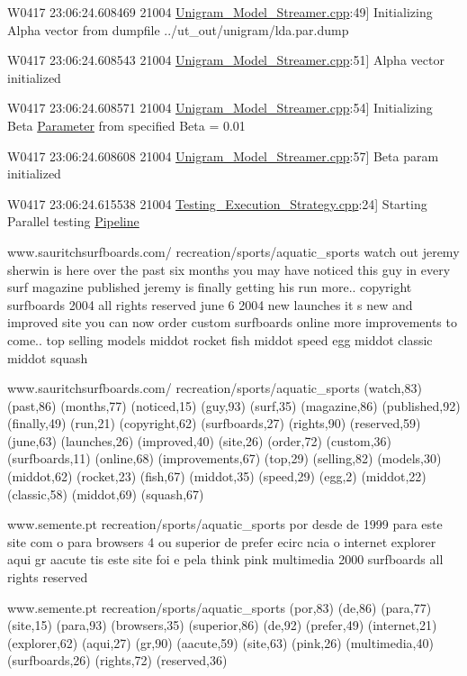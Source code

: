{\ttfamily W0417 23:06:24.608469 21004 \hyperlink{_unigram___model___streamer_8cpp}{Unigram\_\-Model\_\-Streamer.cpp}:49\mbox{]} Initializing Alpha vector from dumpfile ../ut\_\-out/unigram/lda.par.dump  }

{\ttfamily W0417 23:06:24.608543 21004 \hyperlink{_unigram___model___streamer_8cpp}{Unigram\_\-Model\_\-Streamer.cpp}:51\mbox{]} Alpha vector initialized  }

{\ttfamily W0417 23:06:24.608571 21004 \hyperlink{_unigram___model___streamer_8cpp}{Unigram\_\-Model\_\-Streamer.cpp}:54\mbox{]} Initializing Beta \hyperlink{struct_parameter}{Parameter} from specified Beta = 0.01  }

{\ttfamily W0417 23:06:24.608608 21004 \hyperlink{_unigram___model___streamer_8cpp}{Unigram\_\-Model\_\-Streamer.cpp}:57\mbox{]} Beta param initialized  }

{\ttfamily W0417 23:06:24.615538 21004 \hyperlink{_testing___execution___strategy_8cpp}{Testing\_\-Execution\_\-Strategy.cpp}:24\mbox{]} Starting Parallel testing \hyperlink{class_pipeline}{Pipeline}  }

{\ttfamily www.sauritchsurfboards.com/ recreation/sports/aquatic\_\-sports watch out jeremy sherwin is here over the past six months you may have noticed this guy in every surf magazine published jeremy is finally getting his run more.. copyright surfboards 2004 all rights reserved june 6 2004 new launches it s new and improved site you can now order custom surfboards online more improvements to come.. top selling models middot rocket fish middot speed egg middot classic middot squash  }

{\ttfamily www.sauritchsurfboards.com/ recreation/sports/aquatic\_\-sports (watch,83) (past,86) (months,77) (noticed,15) (guy,93) (surf,35) (magazine,86) (published,92) (finally,49) (run,21) (copyright,62) (surfboards,27) (rights,90) (reserved,59) (june,63) (launches,26) (improved,40) (site,26) (order,72) (custom,36) (surfboards,11) (online,68) (improvements,67) (top,29) (selling,82) (models,30) (middot,62) (rocket,23) (fish,67) (middot,35) (speed,29) (egg,2) (middot,22) (classic,58) (middot,69) (squash,67)  }

{\ttfamily www.semente.pt recreation/sports/aquatic\_\-sports por desde de 1999 para este site com o para browsers 4 ou superior de prefer ecirc ncia o internet explorer aqui gr aacute tis este site foi e pela think pink multimedia 2000 surfboards all rights reserved  }

{\ttfamily www.semente.pt recreation/sports/aquatic\_\-sports (por,83) (de,86) (para,77) (site,15) (para,93) (browsers,35) (superior,86) (de,92) (prefer,49) (internet,21) (explorer,62) (aqui,27) (gr,90) (aacute,59) (site,63) (pink,26) (multimedia,40) (surfboards,26) (rights,72) (reserved,36) }

